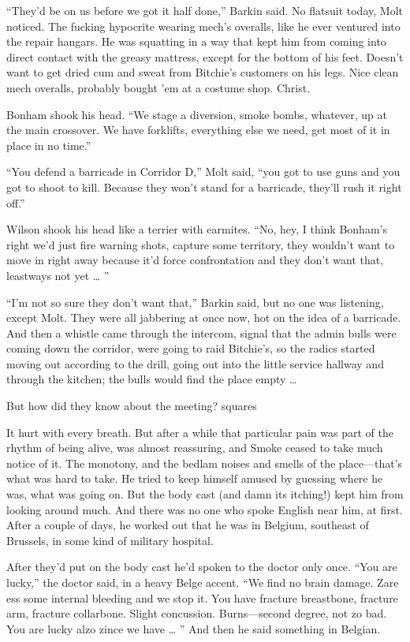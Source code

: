 “They’d be on us before we got it half done,” Barkin said. No flatsuit today, Molt noticed. The fucking hypocrite wearing mech’s overalls, like he ever ventured into the repair hangars. He was squatting in a way that kept him from coming into direct contact with the greasy mattress, except for the bottom of his feet. Doesn’t want to get dried cum and sweat from Bitchie’s customers on his legs. Nice clean mech overalls, probably bought ’em at a costume shop. Christ.

Bonham shook his head. “We stage a diversion, smoke bombs, whatever, up at the main crossover. We have forklifts, everything else we need, get most of it in place in no time.”

“You defend a barricade in Corridor D,” Molt said, “you got to use guns and you got to shoot to kill. Because they won’t stand for a barricade, they’ll rush it right off.”

Wilson shook his head like a terrier with earmites. “No, hey, I think Bonham’s right we’d just fire warning shots, capture some territory, they wouldn’t want to move in right away because it’d force confrontation and they don’t want that, leastways not yet … ”

“I’m not so sure they don’t want that,” Barkin said, but no one was listening, except Molt. They were all jabbering at once now, hot on the idea of a barricade. And then a whistle came through the intercom, signal that the admin bulls were coming down the corridor, were going to raid Bitchie’s, so the radics started moving out according to the drill, going out into the little service hallway and through the kitchen; the bulls would find the place empty …

But how did they know about the meeting?
squares

It hurt with every breath. But after a while that particular pain was part of the rhythm of being alive, was almost reassuring, and Smoke ceased to take much notice of it. The monotony, and the bedlam noises and smells of the place—that’s what was hard to take. He tried to keep himself amused by guessing where he was, what was going on. But the body cast (and damn its itching!) kept him from looking around much. And there was no one who spoke English near him, at first. After a couple of days, he worked out that he was in Belgium, southeast of Brussels, in some kind of military hospital.

After they’d put on the body cast he’d spoken to the doctor only once. “You are lucky,” the doctor said, in a heavy Belge accent. “We find no brain damage. Zare ess some internal bleeding and we stop it. You have fracture breastbone, fracture arm, fracture collarbone. Slight concussion. Burns—second degree, not zo bad. You are lucky alzo zince we have … ” And then he said something in Belgian.

